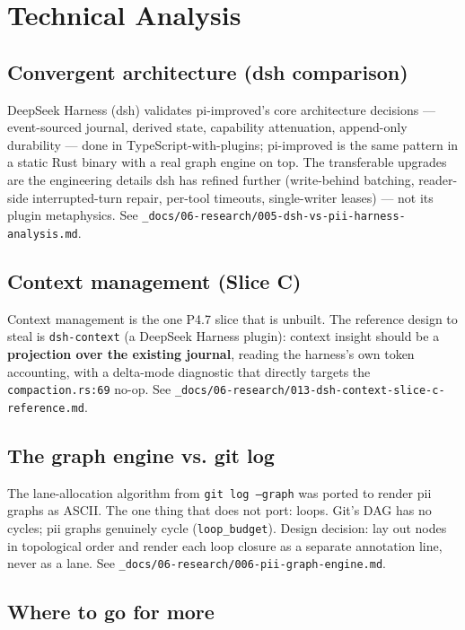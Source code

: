 \documentclass[
	fontsize=10pt,
	twoside=false,
	secnumdepth=2,
	open=any,
]{kaobook}
\begin{document}
\chapter{Technical Analysis}
\label{chap:analysis}

\section{Convergent architecture (dsh comparison)}

DeepSeek Harness (dsh) validates pi-improved's core architecture
decisions — event-sourced journal, derived state, capability attenuation,
append-only durability — done in TypeScript-with-plugins; pi-improved is
the same pattern in a static Rust binary with a real graph engine on top.
The transferable upgrades are the engineering details dsh has refined
further (write-behind batching, reader-side interrupted-turn repair,
per-tool timeouts, single-writer leases) — not its plugin metaphysics.
See \texttt{\_docs/06-research/005-dsh-vs-pii-harness-analysis.md}.

\section{Context management (Slice C)}

Context management is the one P4.7 slice that is unbuilt. The reference
design to steal is \texttt{dsh-context} (a DeepSeek Harness plugin):
context insight should be a \textbf{projection over the existing journal},
reading the harness's own token accounting, with a delta-mode diagnostic
that directly targets the \texttt{compaction.rs:69} no-op. See
\texttt{\_docs/06-research/013-dsh-context-slice-c-reference.md}.

\section{The graph engine vs. git log}

The lane-allocation algorithm from \texttt{git log --graph} was ported to
render pii graphs as ASCII. The one thing that does not port: loops. Git's
DAG has no cycles; pii graphs genuinely cycle (\texttt{loop\_budget}).
Design decision: lay out nodes in topological order and render each loop
closure as a separate annotation line, never as a lane. See
\texttt{\_docs/06-research/006-pii-graph-engine.md}.

\section{Where to go for more}
\end{document}
